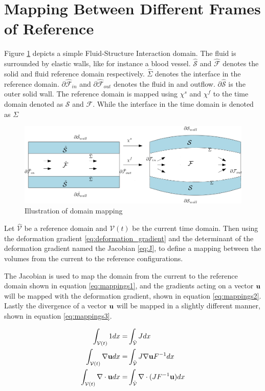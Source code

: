 \section{Mapping Between Different Frames of Reference}
Figure \ref{pic:FSI_mapping} depicts a simple Fluid-Structure Interaction domain. The fluid is surrounded by elastic walls, like for instance a blood vessel. 
$\hat{\mathcal{S}}$ and $\hat{\mathcal{F}}$ denotes the solid and fluid reference domain respectively. $\hat{\Sigma}$ denotes the interface in the reference domain. $\partial\hat{\mathcal{F}}_{in}$ and $\partial\hat{\mathcal{F}}_{out}$ denotes the fluid in and outflow. $\partial \hat{\mathcal{S}}$ is the outer solid wall. The reference domain is mapped using $\chi^s$ and $\chi^f$ to the time domain denoted as $\mathcal{S}$ and $\mathcal{F}$. While the interface in the time domain is denoted as $\Sigma$

\begin{figure}[H]
\label{pic:FSI_mapping}
\includegraphics[scale=0.45]{./FSI_ALE_formulation/FSI_mapping.png}
\caption{Illustration of domain mapping}
\end{figure}

Let $\hat{\mathcal{V}}$ be a reference domain and $\mathcal{V}(t)$ be the current time domain. Then using the deformation gradient \eqref{eq:deformation_gradient} and the determinant of the deformation gradient named the Jacobian \eqref{eq:J}, to define a mapping between the volumes from the current to the reference configurations.

The Jacobian is used to map the domain from the current to the reference domain shown in equation \ref{eq:mappings1}, and the gradients acting on a vector $ \bold{u} $ will be mapped with the deformation gradient, shown in equation \ref{eq:mappings2}. Lastly the divergence of a vector $ \bold{u}$ will be mapped in a slightly different manner, shown in equation \ref{eq:mappings3}.

\begin{align}
\int_{\mathcal{V}(t)} 1  dx =& \int_{\hat{\mathcal{V}}} J dx  \label{eq:mappings1}\\
\int_{\mathcal{V}(t)} \nabla \bold{u}   dx =& \int_{\hat{\mathcal{V}}} J  \nabla \bold{u}F^{-1} dx \label{eq:mappings2} \\
\int_{\mathcal{V}(t)} \nabla \cdot \bold{u}   dx =& \int_{\hat{\mathcal{V}}} \nabla \cdot( J  F^{-1} \bold{u}) dx  \label{eq:mappings3}
\end{align}

